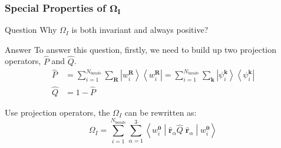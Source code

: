 \documentclass{beamer}
\begin{document}
  \begin{frame}
    \frametitle{Special Properties of \(\mathbf{\Omega_I}\)}

    \begin{alertblock}{Question}
      Why \(\Omega_I\) is both invariant and always positive? 
    \end{alertblock}

    \begin{block}{Answer}
      To answer this question, firstly, we need to build up two projection operators, \(\widehat{P}\) and \(\widehat{Q}\). 
      \begin{subequations}
        \begin{align}
          \widehat{P} &= \sum_{i=1}^{N_{bands}}\sum_{\mathbf{R}}\left|w_i^{\mathbf{R}}\right\rangle\left\langle{}w_i^{\mathbf{R}}\right| = \sum_{i=1}^{N_{bands}}\sum_{\mathbf{k}}\left|\psi_i^{\mathbf{k}}\right\rangle\left\langle{}\psi_i^{\mathbf{k}}\right|\\
          \widehat{Q} &= 1 - \widehat{P}
        \end{align}
      \end{subequations}

      Use projection operators, the \(\Omega_I\) can be rewritten as:
      \begin{equation}
        \Omega_I = \sum_{i=1}^{N_{bands}}\sum_{\alpha=1}^3\left\langle{}w_i^{\mathbf{0}}\middle|\widehat{\mathbf{r}}_\alpha\widehat{Q}\;\widehat{\mathbf{r}}_\alpha\middle|{}w_i^\mathbf{0}\right\rangle
      \end{equation} 
    \end{block}

  \end{frame}
\end{document}
